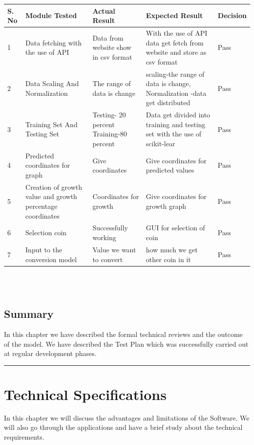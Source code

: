 \documentclass[openany,12pt]{report}
\begin{document}
{{{{{\begin{tabular}{|p{1.2cm}|p{5cm}|p{2.5cm}|p{2.5cm}|p{3cm}| }\hline
\textbf{S. No} 	&\textbf{Module Tested}	&\textbf{Actual Result}	&\textbf{Expected Result} &\textbf{Decision}\\\hline\hline
1 & Data fetching with the use of API 	& Data from website show in csv format & With the use of API data get fetch from website and store as csv format & Pass \\\hline
2 & Data Scaling And Normalization&The range of data is change &scaling-the range of data is change, Normalization -data get distributed&Pass\\\hline
3 &Training Set And Testing Set & Testing- 20 percent Training-80 percent &Data get divided into training and testing set with the use of scikit-lear &Pass\\\hline
4 &Predicted coordinates for graph &Give coordinates&Give coordinates for predicted values &Pass \\\hline
5 &Creation of growth value and growth percentage coordinates&Coordinates for growth & Give coordinates for growth graph&Pass\\\hline
6 &Selection coin &Successfully working &GUI for selection of coin & Pass \\\hline
7 &Input to the conversion model& Value we want to convert & how much we get other coin in it &Pass\\\hline
\end{tabular}

\\
\\

\section{Summary}
In this chapter we have described the formal technical reviews and the outcome of the model. We have described the Test Plan which was successfully carried out at regular development phases.\\
\vfill
\hrule
\chapter{Technical Specifications}
\hspace*{0.5in}In this chapter we will discuss the advantages and limitations of the Software. We will also go through the applications and have a brief study about the technical requirements.
}}}}}
\end{document}
